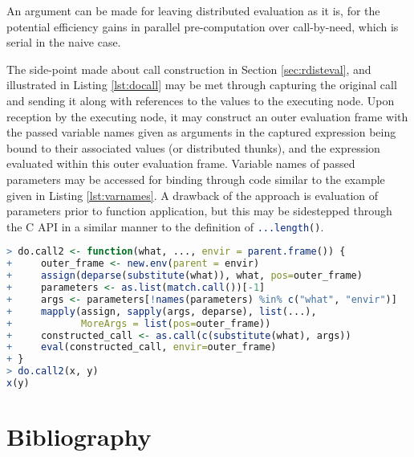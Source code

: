 \documentclass[10pt,a4paper]{article}
\begin{document}
An argument can be made for leaving distributed evaluation as it is, for the potential efficiency gains in parallel pre-computation over call-by-need, which is serial in the naive case.

The side-point made about call construction in Section \ref{sec:rdisteval}, and illustrated in Listing \ref{lst:docall} may be met through capturing the original call and sending it along with references to the values to the executing node.
Upon reception by the executing node, it may construct an outer evaluation frame with the passed variable names given as arguments in the captured expression being bound to their associated values (or distributed thunks)\cite{ingerman1961thunks}, and the expression evaluated within this outer evaluation frame.
Variable names of passed parameters may be accessed for binding through code similar to the example given in Listing \ref{lst:varnames}.
A drawback of the approach is evaluation of parameters prior to function application, but this may be sidestepped through the C API in a similar manner to the definition of \lstinline[language=R]{...length()}\cite{abelson1996sicp:order}.

\begin{lstlisting}[language=R,float,caption={Access to variable names given as formal parameters to a function call using x and y as defined in Listing \ref{lst:docall}},label=lst:varnames]
> do.call2 <- function(what, ..., envir = parent.frame()) {
+     outer_frame <- new.env(parent = envir)
+     assign(deparse(substitute(what)), what, pos=outer_frame)
+     parameters <- as.list(match.call())[-1]
+     args <- parameters[!names(parameters) %in% c("what", "envir")]
+     mapply(assign, sapply(args, deparse), list(...),
+            MoreArgs = list(pos=outer_frame))
+     constructed_call <- as.call(c(substitute(what), args))
+     eval(constructed_call, envir=outer_frame)
+ }
> do.call2(x, y)
x(y)
\end{lstlisting}

\section{Bibliography}



\end{document}
